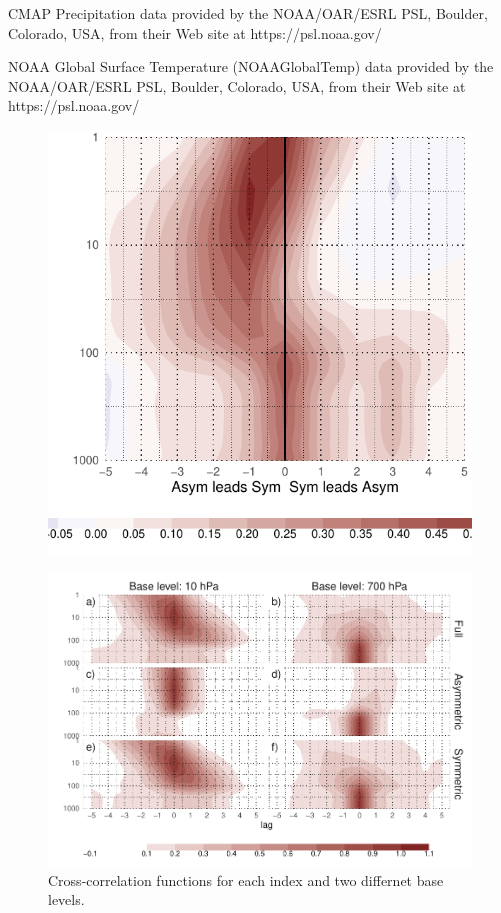 \documentclass[]{ametsocV5}
\begin{document}
CMAP Precipitation data provided by the NOAA/OAR/ESRL PSL, Boulder,
Colorado, USA, from their Web site at https://psl.noaa.gov/

NOAA Global Surface Temperature (NOAAGlobalTemp) data provided by the
NOAA/OAR/ESRL PSL, Boulder, Colorado, USA, from their Web site at
https://psl.noaa.gov/



\newpage

\appendix


\begin{figure}
\includegraphics{A1-1} \label{fig:A1}
\end{figure}

\begin{figure}
\includegraphics{A2 ccf-levels-1} \caption[Cross-correlation functions for each index and two differnet base levels]{Cross-correlation functions for each index and two differnet base levels.}\label{fig:A2 ccf-levels}
\end{figure}
\end{document}
